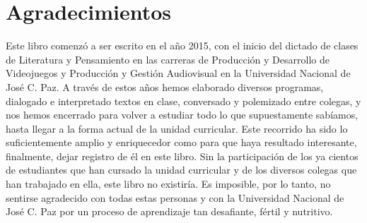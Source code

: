 \newif\ifPDF%
\newif\ifBNPDF%
\newif\ifEPUB%
\newif\ifHTML%
\newif\ifODT%

 \PDFtrue





\ifODT
\usepackage[unicode,hyperindex=true]{hyperref}
\else
	\ifPDF
	\usepackage[hyphenation,homeoarchy,draft,homeoarchywordcolor=yellow,homeoarchycharcolor=yellow]{impnattypo}
	\usepackage[allcolors=magenta,colorlinks]{hyperref}
	\usepackage{hyperxmp}
	
	\else
		\ifBNPDF
		\usepackage[cam,width=18truecm,height=25.5truecm,center]{crop}
		\usepackage[hidelinks]{hyperref}
		\usepackage{hyperxmp}
		
		\else
			\ifEPUB
			\usepackage[hyperindex=true,allcolors=magenta,colorlinks]{hyperref}
			\fi
		\fi
	\fi
\fi


\frontmatter

\ifEPUB%
	\ifdefined\HCode
	\phantomsection
	\addcontentsline{toc}{section}{Portada}
	\coverimage{./media/cover.png}
	\clearpage
	\fi
\fi

\ifPDF

\else
	\ifBNPDF
	
	\fi
\fi

\tableofcontents

\chapter{Agradecimientos}

Este libro comenzó a ser escrito en el año 2015, con el inicio del dictado de clases de Literatura y Pensamiento en las carreras de Producción y Desarrollo de Videojuegos y Producción y Gestión Audiovisual en la Universidad Nacional de José C. Paz. A través de estos años hemos elaborado diversos programas, dialogado e interpretado textos en clase, conversado y polemizado entre colegas, y nos hemos encerrado para volver a estudiar todo lo que supuestamente sabíamos, hasta llegar a la forma actual de la unidad curricular. Este recorrido ha sido lo suficientemente amplio y enriquecedor como para que haya resultado interesante, finalmente, dejar registro de él en este libro. Sin la participación de los ya cientos de estudiantes que han cursado la unidad curricular y de los diversos colegas que han trabajado en ella, este libro no existiría. Es imposible, por lo tanto, no sentirse agradecido con todas estas personas y con la Universidad Nacional de José C. Paz por un proceso de aprendizaje tan desafiante, fértil y nutritivo.


